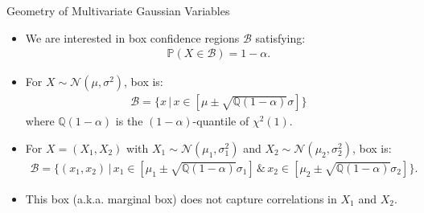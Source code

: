 \documentclass[handout,9pt]{beamer}
\begin{document}
%
\begin{frame}{Geometry of Multivariate Gaussian Variables}

\begin{itemize}
\setlength{\itemsep}{10pt}
\item We are interested in box confidence regions $\mathcal{B}$ satisfying:
\begin{align*}
\mathbb{P}(X\in \mathcal{B})=1-\alpha.
\end{align*}
\item For $X\sim \mathcal{N}(\mu,\sigma^2)$, box is:
\begin{align*}
\mathcal{B}=\{x\,|\,x\in [\mu\pm \sqrt{\mathbb{Q}(1-\alpha)} \sigma]\} 
\end{align*}
where $\mathbb{Q}(1-\alpha)$ is the $(1-\alpha)$-quantile of $\chi^2(1)$. 
\item For $X=(X_1,X_2)$ with $X_1\sim \mathcal{N}(\mu_1,\sigma_1^2)$ and $X_2\sim \mathcal{N}(\mu_2,\sigma_2^2)$, box is:
\begin{align*}
\mathcal{B}=\{(x_1,x_2)\,|\,x_1\in [\mu_1\pm \sqrt{\mathbb{Q}(1-\alpha)}\sigma_1]\,\&\,x_2\in [\mu_2\pm \sqrt{\mathbb{Q}(1-\alpha)}\sigma_2]\}.
\end{align*}
\item This box (a.k.a. marginal box) does not capture correlations in $X_1$ and $X_2$. 
\end{itemize}

\end{frame}
\end{document}
